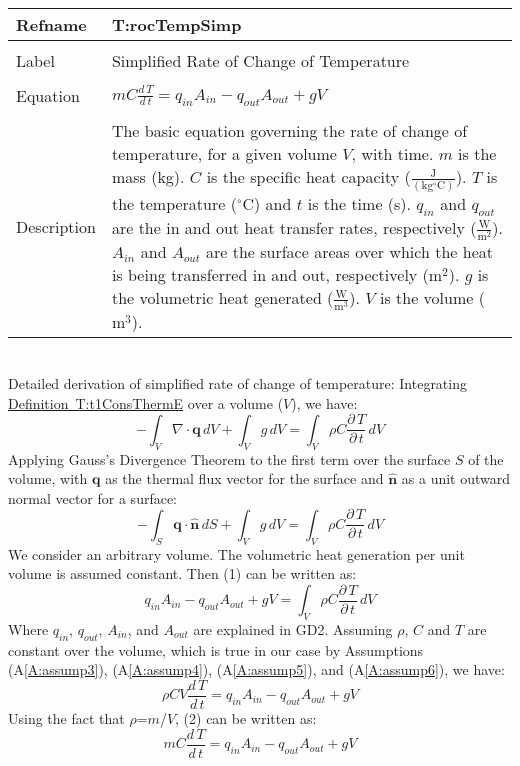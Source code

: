 \documentclass[12pt]{article}
\begin{document}
\noindent \begin{minipage}{\textwidth}
\begin{tabular}{p{} p{}}
\toprule \textbf{Refname} & \textbf{T:rocTempSimp}
\label{T:rocTempSimp}
\\ \midrule \\
Label & Simplified Rate of Change of Temperature
\\ \midrule \\
Equation & $m C \frac{d\,T}{d\,t}={q_{in}} {A_{in}}-{q_{out}} {A_{out}}+g V$
\\ \midrule \\
Description & The basic equation governing the rate of change of temperature, for a given volume $V$, with time. $m$ is the mass (kg). $C$ is the specific heat capacity ($\frac{\text{J}}{(\text{kg}{}^{\circ}\text{C})}$). $T$ is the temperature (${}^{\circ}$C) and $t$ is the time (s). ${q_{in}}$ and ${q_{out}}$ are the in and out heat transfer rates, respectively ($\frac{\text{W}}{\text{m}^{2}}$). ${A_{in}}$ and ${A_{out}}$ are the surface areas over which the heat is being transferred in and out, respectively ($\text{m}^{2}$). $g$ is the volumetric heat generated ($\frac{\text{W}}{\text{m}^{3}}$). $V$ is the volume ($\text{m}^{3}$).
\\ \bottomrule \end{tabular}
\end{minipage}\\
Detailed derivation of simplified rate of change of temperature:
Integrating \hyperref[T:t1ConsThermE]{Definition~T:t1ConsThermE} over a volume ($V$), we have:
\begin{dmath}
-\int_{V}{∇\cdot{}\mathbf{q}}\,dV+\int_{V}{g}\,dV=\int_{V}{ρ C \frac{\partial{}\,T}{\partial{}\,t}}\,dV
\end{dmath}
Applying Gauss's Divergence Theorem to the first term over the surface $S$ of the volume, with $\mathbf{q}$ as the thermal flux vector for the surface and $\mathbf{\hat{n}}$ as a unit outward normal vector for a surface:
\begin{dmath}
-\int_{S}{\mathbf{q}\cdot{}\mathbf{\hat{n}}}\,dS+\int_{V}{g}\,dV=\int_{V}{ρ C \frac{\partial{}\,T}{\partial{}\,t}}\,dV
\end{dmath}
We consider an arbitrary volume. The volumetric heat generation per unit volume is assumed constant. Then (1) can be written as:
\begin{dmath}
{q_{in}} {A_{in}}-{q_{out}} {A_{out}}+g V=\int_{V}{ρ C \frac{\partial{}\,T}{\partial{}\,t}}\,dV
\end{dmath}
Where ${q_{in}}$, ${q_{out}}$, ${A_{in}}$, and ${A_{out}}$ are explained in GD2. Assuming $ρ$, $C$ and $T$ are constant over the volume, which is true in our case by Assumptions (A\ref{A:assump3}), (A\ref{A:assump4}), (A\ref{A:assump5}), and (A\ref{A:assump6}), we have:
\begin{dmath}
ρ C V \frac{d\,T}{d\,t}={q_{in}} {A_{in}}-{q_{out}} {A_{out}}+g V
\end{dmath}
Using the fact that $ρ$=$m$/$V$, (2) can be written as:
\begin{dmath}
m C \frac{d\,T}{d\,t}={q_{in}} {A_{in}}-{q_{out}} {A_{out}}+g V
\end{dmath}
\end{document}
